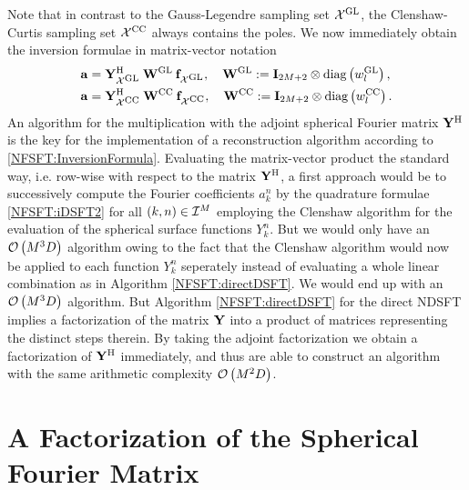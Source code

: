 Note that in contrast to the Gauss-Legendre sampling set $\mathcal{X}^{\mbox{\scriptsize\rm{GL}}}$,
the Clenshaw-Curtis sampling set $\mathcal{X}^{\mbox{\scriptsize\rm{CC}}}$ always contains the poles.
We now immediately obtain the inversion formulae in matrix-vector notation
\begin{equation}
  \label{NFSFT:InversionFormula}
  \begin{split}
    \mathbf{a} & = \mathbf{Y}_{\mathcal{X}^{\mbox{\scriptsize\rm{GL}}}}^{\text{\rm{H}}} \: \mathbf{W}^{\mbox{\scriptsize\rm{GL}}} \:
    \mathbf{f}_{\mathcal{X}^{\mbox{\scriptsize\rm{GL}}}},\quad \mathbf{W}^{\mbox{\scriptsize\rm{GL}}} := \mathbf{I}_{2M+2} 
    \otimes \text{\rm{diag}}\left(w_{l}^{\mbox{\scriptsize\rm{GL}}}\right),\\
    \mathbf{a} & = \mathbf{Y}_{\mathcal{X}^{\mbox{\scriptsize\rm{CC}}}}^{\text{\rm{H}}} \: \mathbf{W}^{\mbox{\scriptsize\rm{CC}}} \:
    \mathbf{f}_{\mathcal{X}^{\mbox{\scriptsize\rm{CC}}}},\quad \mathbf{W}^{\mbox{\scriptsize\rm{CC}}} := \mathbf{I}_{2M+2} 
    \otimes \text{\rm{diag}}\left(w_{l}^{\mbox{\scriptsize\rm{CC}}}\right).
  \end{split}  
\end{equation}  
An algorithm for the multiplication with the adjoint spherical Fourier matrix $\mathbf{Y}^{\text{\rm{H}}}$ is 
the key for the implementation of a reconstruction algorithm according to 
\eqref{NFSFT:InversionFormula}. Evaluating the
matrix-vector product the standard way, i.e. row-wise with respect to the matrix $\mathbf{Y}^{\text{\rm{H}}}$, 
a first approach 
would be to successively compute the Fourier coefficients $a_{k}^n$ by the quadrature formulae 
\eqref{NFSFT:iDSFT2} for all $\left(k,n\right) \in \mathcal{I}^M$ employing the Clenshaw 
algorithm for the evaluation of the spherical surface functions $Y_{k}^n$. But we would only have an 
$\mathcal{O}\left(M^3 D\right)$ algorithm owing to the fact that the Clenshaw algorithm would now be 
applied to each function $Y_{k}^n$ seperately instead of evaluating a whole linear 
combination as in Algorithm \ref{NFSFT:directDSFT}. 
We would end up with an $\mathcal{O}\left(M^3 D\right)$ algorithm. But Algorithm \ref{NFSFT:directDSFT} 
for the direct NDSFT implies a factorization of 
the matrix $\mathbf{Y}$ into a product of matrices representing the distinct steps therein.
By taking the adjoint factorization we obtain a factorization of $\mathbf{Y}^{\text{\rm{H}}}$ immediately, and 
thus are able to construct an algorithm with the same arithmetic complexity $\mathcal{O}\left(M^2 D\right)$.

\section{A Factorization of the Spherical Fourier Matrix}
\label{NFSFT:Factorization}

